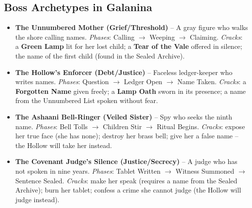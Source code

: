 \subsection*{Boss Archetypes in Galanina}
\label{sec:galanina-bosses}
\begin{itemize}
\item \textbf{The Unnumbered Mother (Grief/Threshold)} -- A gray figure who walks the shore calling names. \emph{Phases}: Calling $\rightarrow$ Weeping $\rightarrow$ Claiming. \emph{Cracks}: a \textbf{Green Lamp} lit for her lost child; a \textbf{Tear of the Vale} offered in silence; the name of the first child (found in the Sealed Archive).
\item \textbf{The Hollow's Enforcer (Debt/Justice)} -- Faceless ledger-keeper who writes names. \emph{Phases}: Question $\rightarrow$ Ledger Open $\rightarrow$ Name Taken. \emph{Cracks}: a \textbf{Forgotten Name} given freely; a \textbf{Lamp Oath} sworn in its presence; a name from the Unnumbered List spoken without fear.
\item \textbf{The Ashaani Bell-Ringer (Veiled Sister)} -- Spy who seeks the ninth name. \emph{Phases}: Bell Tolls $\rightarrow$ Children Stir $\rightarrow$ Ritual Begins. \emph{Cracks}: expose her true face (she has none); destroy her brass bell; give her a false name -- the Hollow will take her instead.
\item \textbf{The Covenant Judge's Silence (Justice/Secrecy)} -- A judge who has not spoken in nine years. \emph{Phases}: Tablet Written $\rightarrow$ Witness Summoned $\rightarrow$ Sentence Sealed. \emph{Cracks}: make her speak (requires a name from the Sealed Archive); burn her tablet; confess a crime she cannot judge (the Hollow will judge instead).
\end{itemize}

